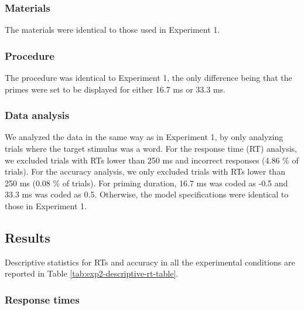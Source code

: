 \documentclass[
  english,
  man,floatsintext]{apa6}
\begin{document}
\hypertarget{materials-1}{%
\subsubsection{Materials}\label{materials-1}}

The materials were identical to those used in Experiment 1.

\hypertarget{procedure-1}{%
\subsubsection{Procedure}\label{procedure-1}}

The procedure was identical to Experiment 1, the only difference being that the primes were set to be displayed for either 16.7 ms or 33.3 ms.

\hypertarget{data-analysis-1}{%
\subsubsection{Data analysis}\label{data-analysis-1}}

We analyzed the data in the same way as in Experiment 1, by only analyzing trials where the target stimulus was a word. For the response time (RT) analysis, we excluded trials with RTs lower than 250 ms and incorrect responses (4.86 \% of trials). For the accuracy analysis, we only excluded trials with RTs lower than 250 ms (0.08 \% of trials). For priming duration, 16.7 ms was coded as -0.5 and 33.3 ms was coded as 0.5. Otherwise, the model specifications were identical to those in Experiment 1.

\hypertarget{results-1}{%
\subsection{Results}\label{results-1}}

Descriptive statistics for RTs and accuracy in all the experimental conditions are reported in Table \ref{tab:exp2-descriptive-rt-table}.

\hypertarget{response-times-1}{%
\subsubsection{Response times}\label{response-times-1}}
\end{document}
